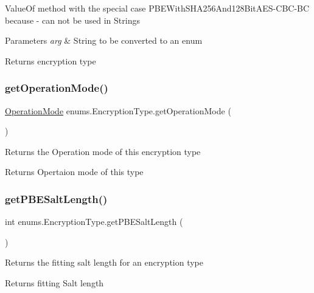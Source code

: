 Value\+Of method with the special case P\+B\+E\+With\+S\+H\+A256\+And128\+Bit\+A\+E\+S-\/\+C\+B\+C-\/\+BC because \textquotesingle{}-\/\textquotesingle{} can not be used in Strings 
\begin{DoxyParams}{Parameters}
{\em arg} & String to be converted to an enum \\
\hline
\end{DoxyParams}
\begin{DoxyReturn}{Returns}
encryption type 
\end{DoxyReturn}
\mbox{\label{enumenums_1_1_encryption_type_a296c258a5b6eee39b475d946ab29757f}} 
\subsubsection{\texorpdfstring{get\+Operation\+Mode()}{getOperationMode()}}
{\footnotesize\ttfamily \mbox{\hyperlink{enumenums_1_1_operation_mode}{Operation\+Mode}} enums.\+Encryption\+Type.\+get\+Operation\+Mode (\begin{DoxyParamCaption}{ }\end{DoxyParamCaption})}

Returns the Operation mode of this encryption type \begin{DoxyReturn}{Returns}
Opertaion mode of this type 
\end{DoxyReturn}
\mbox{\label{enumenums_1_1_encryption_type_a1afa9d50b477f0206b5143a7d6b484a4}} 
\subsubsection{\texorpdfstring{get\+P\+B\+E\+Salt\+Length()}{getPBESaltLength()}}
{\footnotesize\ttfamily int enums.\+Encryption\+Type.\+get\+P\+B\+E\+Salt\+Length (\begin{DoxyParamCaption}{ }\end{DoxyParamCaption})}

Returns the fitting salt length for an encryption type \begin{DoxyReturn}{Returns}
fitting Salt length 
\end{DoxyReturn}
\mbox{\label{enumenums_1_1_encryption_type_add4096e0732de7639893f5811f013377}} 
